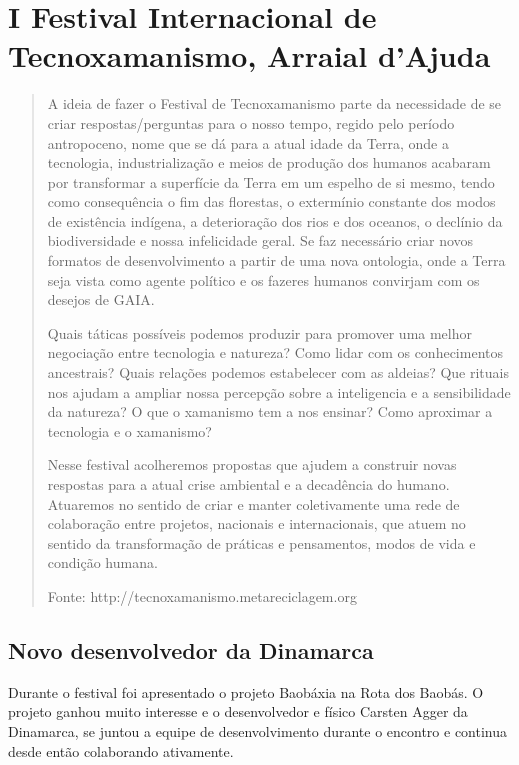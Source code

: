 \documentclass[a4paper, 11pt, oneside]{Relatorio_sem_2}  %
\begin{document}
\section{I Festival Internacional de Tecnoxamanismo, Arraial d'Ajuda}
\begin{quote}
A ideia de fazer o Festival de Tecnoxamanismo parte da necessidade de
se criar respostas/perguntas para o nosso tempo, regido pelo período
antropoceno, nome que se dá para a atual idade da Terra, onde a
tecnologia, industrialização e meios de produção dos humanos acabaram
por transformar a superfície da Terra em um espelho de si mesmo, tendo
como consequência o fim das florestas, o extermínio constante dos
modos de existência indígena, a deterioração dos rios e dos oceanos, o
declínio da biodiversidade e nossa infelicidade geral. Se faz
necessário criar novos formatos de desenvolvimento a partir de uma
nova ontologia, onde a Terra seja vista como agente político e os
fazeres humanos convirjam com os desejos de GAIA.

Quais táticas possíveis podemos produzir para promover uma melhor
negociação entre tecnologia e natureza? Como lidar com os
conhecimentos ancestrais? Quais relações podemos estabelecer com as
aldeias? Que rituais nos ajudam a ampliar nossa percepção sobre a
inteligencia e a sensibilidade da natureza? O que o xamanismo tem a
nos ensinar? Como aproximar a tecnologia e o xamanismo?

Nesse festival acolheremos propostas que ajudem a construir novas
respostas para a atual crise ambiental e a decadência do
humano. Atuaremos no sentido de criar e manter coletivamente uma rede
de colaboração entre projetos, nacionais e internacionais, que atuem
no sentido da transformação de práticas e pensamentos, modos de vida e
condição humana.
\begin{flushright}                                                                                                Fonte: http://tecnoxamanismo.metareciclagem.org 
\end{flushright}
\end{quote}

\subsection{Novo desenvolvedor da Dinamarca}
Durante o festival foi apresentado o projeto Baobáxia na Rota dos
Baobás. O projeto ganhou muito interesse e o desenvolvedor e físico
Carsten Agger da Dinamarca, se juntou a equipe de desenvolvimento
durante o encontro e continua desde então colaborando ativamente.
\end{document}
